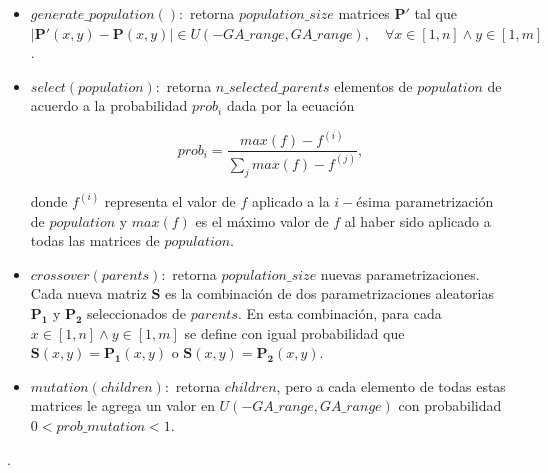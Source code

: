 \begin{itemize}
    \item $generate\_population():$ 
      retorna $population\_size$ matrices 
      $\boldsymbol{P'}$ tal que 
      $|\boldsymbol{P'}(x, y) - \boldsymbol{P}(x, y)| \in U(-GA\_range, GA\_range), \quad \forall x \in [1, n]
      \land y \in [1, m]$.

    \item $select(population):$ 
      retorna $n\_selected\_parents$ elementos de $population$ de
      acuerdo a la probabilidad $prob_i$ dada por la ecuación
    
    \begin{equation}
      prob_i = \frac{max(f) - f^{(i)}}{\displaystyle\sum_{j} max(f) - f^{(j)}},
    \label{eq:prob}
    \end{equation}
    
    donde $f^{(i)}$ representa el valor de $f$ aplicado a la 
    $i-$ésima parametrización de $population$ y $max(f)$ es el máximo
    valor de $f$ al haber sido aplicado a todas las matrices de $population$.
    
    \item $crossover(parents):$ 
    retorna $population\_size$ nuevas parametrizaciones.
    Cada nueva matriz $\boldsymbol{S}$ es la combinación de dos parametrizaciones aleatorias 
    $\boldsymbol{P_1}$ y $\boldsymbol{P_2}$ seleccionados de $parents$.
    En esta combinación, para cada $x \in [1, n] \land y \in [1, m]$ se define 
    con igual probabilidad que
    $\boldsymbol{S}(x, y) = \boldsymbol{P_1}(x, y)$ o
    $\boldsymbol{S}(x, y) = \boldsymbol{P_2}(x, y)$.

    \item $mutation(children):$ 
      retorna $children$, pero
      a cada elemento de todas estas matrices
      le agrega un valor en $U(-GA\_range, GA\_range)$ con
      probabilidad $0 < prob\_mutation < 1$.

\end{itemize}

.

